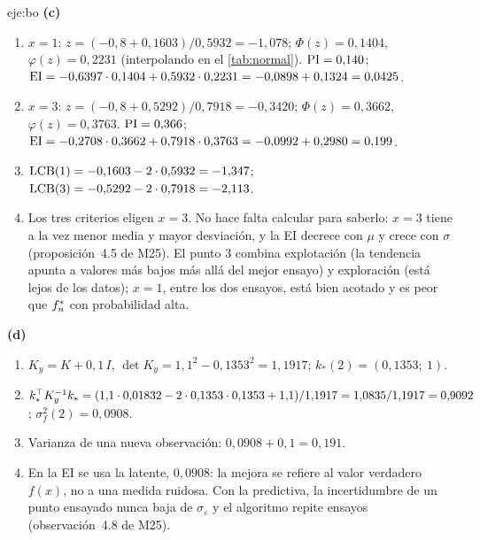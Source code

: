\begin{solucion}{eje:bo}
\noindent\textbf{(c)}
\begin{enumerate}[label=\arabic*.]
  \item $x=1$: $z=(-0{,}8+0{,}1603)/0{,}5932=-1{,}078$; $\Phi(z)=0{,}1404$, $\varphi(z)=0{,}2231$ (interpolando en el \cref{tab:normal}). $\mathrm{PI}=0{,}140$; $\mathrm{EI}=-0{,}6397\cdot 0{,}1404+0{,}5932\cdot 0{,}2231=-0{,}0898+0{,}1324=0{,}0425$.
  \item $x=3$: $z=(-0{,}8+0{,}5292)/0{,}7918=-0{,}3420$; $\Phi(z)=0{,}3662$, $\varphi(z)=0{,}3763$. $\mathrm{PI}=0{,}366$; $\mathrm{EI}=-0{,}2708\cdot 0{,}3662+0{,}7918\cdot 0{,}3763=-0{,}0992+0{,}2980=0{,}199$.
  \item $\mathrm{LCB}(1)=-0{,}1603-2\cdot 0{,}5932=-1{,}347$; $\mathrm{LCB}(3)=-0{,}5292-2\cdot 0{,}7918=-2{,}113$.
  \item Los tres criterios eligen $x=3$. No hace falta calcular para saberlo: $x=3$ tiene a la vez menor media y mayor desviación, y la EI decrece con $\mu$ y crece con $\sigma$ (proposición~4.5 de M25). El punto 3 combina explotación (la tendencia apunta a valores más bajos más allá del mejor ensayo) y exploración (está lejos de los datos); $x=1$, entre los dos ensayos, está bien acotado y es peor que $f^{\ast}_{n}$ con probabilidad alta.
\end{enumerate}

\noindent\textbf{(d)}
\begin{enumerate}[label=\arabic*.]
  \item $K_y=K+0{,}1\,I$, $\det K_y=1{,}1^{2}-0{,}1353^{2}=1{,}1917$; $k_\ast(2)=(0{,}1353;\ 1)$.
  \item $k_\ast^{\top} K_y^{-1}k_\ast=(1{,}1\cdot 0{,}01832-2\cdot 0{,}1353\cdot 0{,}1353+1{,}1)/1{,}1917=1{,}0835/1{,}1917=0{,}9092$; $\sigma^{2}_{f}(2)=0{,}0908$.
  \item Varianza de una nueva observación: $0{,}0908+0{,}1=0{,}191$.
  \item En la EI se usa la latente, $0{,}0908$: la mejora se refiere al valor verdadero $f(x)$, no a una medida ruidosa. Con la predictiva, la incertidumbre de un punto ensayado nunca baja de $\sigma_\varepsilon$ y el algoritmo repite ensayos (observación~4.8 de M25).
\end{enumerate}


\end{solucion}
